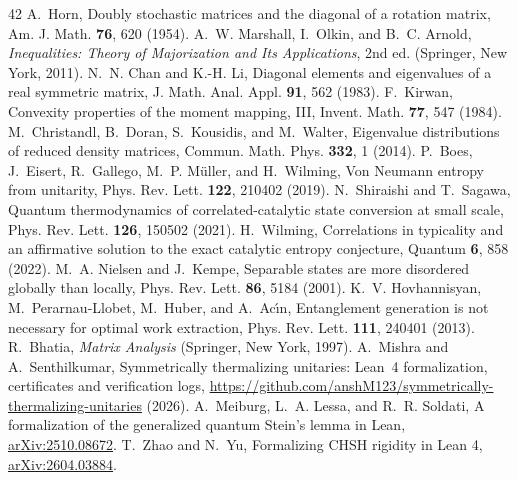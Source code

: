 \begin{thebibliography}{42}
 A.~Horn, Doubly stochastic matrices and the diagonal of a rotation matrix, Am. J. Math. \textbf{76}, 620 (1954).
 A.~W. Marshall, I.~Olkin, and B.~C. Arnold, \textit{Inequalities: Theory of Majorization and Its Applications}, 2nd ed. (Springer, New York, 2011).
 N.~N. Chan and K.-H. Li, Diagonal elements and eigenvalues of a real symmetric matrix, J. Math. Anal. Appl. \textbf{91}, 562 (1983).
 F.~Kirwan, Convexity properties of the moment mapping, III, Invent. Math. \textbf{77}, 547 (1984).
 M.~Christandl, B.~Doran, S.~Kousidis, and M.~Walter, Eigenvalue distributions of reduced density matrices, Commun. Math. Phys. \textbf{332}, 1 (2014).
 P.~Boes, J.~Eisert, R.~Gallego, M.~P. M\"uller, and H.~Wilming, Von Neumann entropy from unitarity, Phys. Rev. Lett. \textbf{122}, 210402 (2019).
 N.~Shiraishi and T.~Sagawa, Quantum thermodynamics of correlated-catalytic state conversion at small scale, Phys. Rev. Lett. \textbf{126}, 150502 (2021).
 H.~Wilming, Correlations in typicality and an affirmative solution to the exact catalytic entropy conjecture, Quantum \textbf{6}, 858 (2022).
 M.~A. Nielsen and J.~Kempe, Separable states are more disordered globally than locally, Phys. Rev. Lett. \textbf{86}, 5184 (2001).
 K.~V. Hovhannisyan, M.~Perarnau-Llobet, M.~Huber, and A.~Ac\'{\i}n, Entanglement generation is not necessary for optimal work extraction, Phys. Rev. Lett. \textbf{111}, 240401 (2013).
 R.~Bhatia, \textit{Matrix Analysis} (Springer, New York, 1997).
 A.~Mishra and A.~Senthilkumar, Symmetrically thermalizing unitaries: Lean~4 formalization, certificates and verification logs, \url{https://github.com/anshM123/symmetrically-thermalizing-unitaries} (2026).
 A.~Meiburg, L.~A. Lessa, and R.~R. Soldati, A formalization of the generalized quantum Stein's lemma in Lean, \href{https://arxiv.org/abs/2510.08672}{arXiv:2510.08672}.
 T.~Zhao and N.~Yu, Formalizing CHSH rigidity in Lean 4, \href{https://arxiv.org/abs/2604.03884}{arXiv:2604.03884}.
\end{thebibliography}
